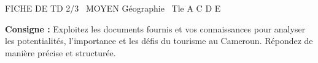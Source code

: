 \documentclass[11pt]{article}
\begin{document}
\begin{tcolorbox}[enhanced,colback=popink,colframe=popink,arc=10pt,boxrule=0pt,left=12pt,right=12pt,top=9pt,bottom=9pt]
{\color{white}\popxbold\small FICHE DE TD 2/3 \textbullet\ MOYEN \hfill Géographie \textbullet\ Tle A C D E\par}
\end{tcolorbox}
\vspace{4pt}
\noindent \textbf{Consigne :} Exploitez les documents fournis et vos connaissances pour analyser les potentialités, l'importance et les défis du tourisme au Cameroun. Répondez de manière précise et structurée.
\end{document}

